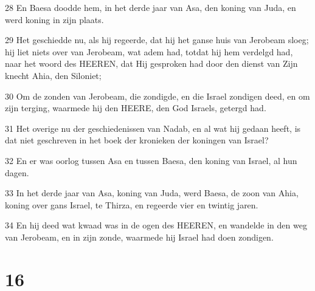 \par 28 En Baesa doodde hem, in het derde jaar van Asa, den koning van Juda, en werd koning in zijn plaats.
\par 29 Het geschiedde nu, als hij regeerde, dat hij het ganse huis van Jerobeam sloeg; hij liet niets over van Jerobeam, wat adem had, totdat hij hem verdelgd had, naar het woord des HEEREN, dat Hij gesproken had door den dienst van Zijn knecht Ahia, den Siloniet;
\par 30 Om de zonden van Jerobeam, die zondigde, en die Israel zondigen deed, en om zijn terging, waarmede hij den HEERE, den God Israels, getergd had.
\par 31 Het overige nu der geschiedenissen van Nadab, en al wat hij gedaan heeft, is dat niet geschreven in het boek der kronieken der koningen van Israel?
\par 32 En er was oorlog tussen Asa en tussen Baesa, den koning van Israel, al hun dagen.
\par 33 In het derde jaar van Asa, koning van Juda, werd Baesa, de zoon van Ahia, koning over gans Israel, te Thirza, en regeerde vier en twintig jaren.
\par 34 En hij deed wat kwaad was in de ogen des HEEREN, en wandelde in den weg van Jerobeam, en in zijn zonde, waarmede hij Israel had doen zondigen.

\chapter{16}

